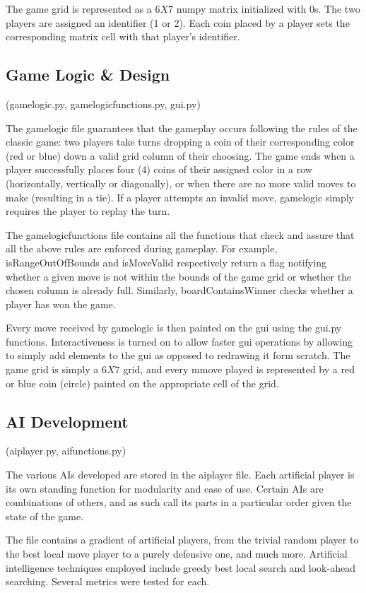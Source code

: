 \documentclass[11pt]{article}
\begin{document}
The game grid is represented as a $6X7$ numpy matrix initialized with 0s. The two players are assigned an identifier (1 or 2). Each coin placed by a player sets the corresponding matrix cell with that player's identifier. 

\subsection{Game Logic \& Design}
(gamelogic.py, gamelogicfunctions.py, gui.py)

The gamelogic file guarantees that the gameplay occurs following the rules of the classic game: two players take turns dropping a coin of their corresponding color (red or blue) down a valid grid column of their choosing. The game ends when a player successfully places four (4) coins of their assigned color in a row (horizontally, vertically or diagonally), or when there are no more valid moves to make (resulting in a tie). If a player attempts an invalid move, gamelogic simply requires the player to replay the turn.

The gamelogicfunctions file contains all the functions that check and assure that all the above rules are enforced during gameplay. For example, isRangeOutOfBounds and isMoveValid respectively return a flag notifying whether a given move is not within the bounds of the game grid or whether the chosen column is already full. Similarly, boardContainsWinner checks whether a player has won the game.

Every move received by gamelogic is then painted on the gui using the gui.py functions. Interactiveness is turned on to allow faster gui operations by allowing to simply add elements to the gui as opposed to redrawing it form scratch. The game grid is simply a $6X7$ grid, and every mmove played is represented by a red or blue coin (circle) painted on the appropriate cell of the grid.

\subsection{AI Development}
(aiplayer.py, aifunctions.py)

The various AIs developed are stored in the aiplayer file. Each artificial player is its own standing function for modularity and ease of use. Certain AIs are combinations of others, and as such call its parts in a particular order given the state of the game.

The file contains a gradient of artificial players, from the trivial random player to the best local move player to a purely defensive one, and much more. Artificial intelligence techniques employed include greedy best local search and look-ahead searching. Several metrics were tested for each. 
\end{document}
